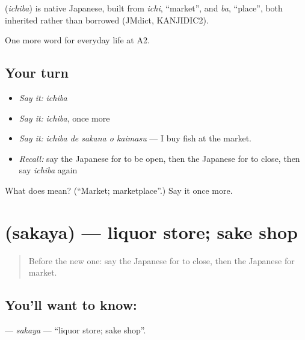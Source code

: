 \begin{cousinweb}
\textbf{} (\emph{ichiba}) is native Japanese, built from \emph{ichi}, \textquotedblleft{}market\textquotedblright{}, and \emph{ba}, \textquotedblleft{}place\textquotedblright{}, both inherited rather than borrowed (JMdict, KANJIDIC2).
\end{cousinweb}

\begin{grammarlens}[title={What you've built}]
One more word for everyday life at A2.
\end{grammarlens}

\subsection*{Your turn}
\begin{itemize}
\raggedright
  \item \emph{Say it:} \emph{ichiba}
  \item \emph{Say it:} \emph{ichiba}, once more
  \item \emph{Say it:} \emph{ichiba de sakana o kaimasu} — I buy fish at the market.
  \item \emph{Recall:} say the Japanese for to be open, then the Japanese for to close, then say \emph{ichiba} again
\end{itemize}

\begin{tcolorbox}[breakable,colback=teal!4,colframe=teal!35!black,title={Before you move on}]
What does  mean? (\textquotedblleft{}Market; marketplace\textquotedblright{}.) Say it once more.
\end{tcolorbox}
\section[\texorpdfstring{\ja{さかや} (sakaya)}{さかや (sakaya)}]{ (sakaya) — liquor store; sake shop}

\label{lesson:JA-C191-sakaya}



\begin{quote}
Before the new one: say the Japanese for to close, then the Japanese for market.
\end{quote}

\subsection*{You'll want to know: }
\textbf{} — \emph{sakaya} — \textquotedblleft{}liquor store; sake shop\textquotedblright{}.

